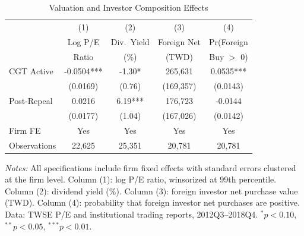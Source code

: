 \begin{table}[htbp]
\centering
\caption{Valuation and Investor Composition Effects}
\label{tab:valuation}
\begin{threeparttable}
\small
\begin{tabular}{lcccc}
\toprule
 & (1) & (2) & (3) & (4) \\
 & Log P/E & Div.~Yield & Foreign Net & Pr(Foreign \\
 & Ratio & (\%) & (TWD) & Buy $>$ 0) \\
\midrule
CGT Active & -0.0504*** & -1.30* & 265,631 & 0.0535*** \\
 & (0.0169) & (0.76) & (169,357) & (0.0143) \\[4pt]
Post-Repeal & 0.0216 & 6.19*** & 176,723 & -0.0144 \\
 & (0.0177) & (1.04) & (167,026) & (0.0142) \\
\midrule
Firm FE & Yes & Yes & Yes & Yes \\
Observations & 22,625 & 25,351 & 20,781 & 20,781 \\
\bottomrule
\end{tabular}
\begin{tablenotes}[flushleft]\footnotesize
\item \textit{Notes:} All specifications include firm fixed effects with standard errors clustered at the firm level. Column (1): log P/E ratio, winsorized at 99th percentile. Column (2): dividend yield (\%). Column (3): foreign investor net purchase value (TWD). Column (4): probability that foreign investor net purchases are positive. Data: TWSE P/E and institutional trading reports, 2012Q3--2018Q4. $^{*}p<0.10$, $^{**}p<0.05$, $^{***}p<0.01$.
\end{tablenotes}
\end{threeparttable}
\end{table}
